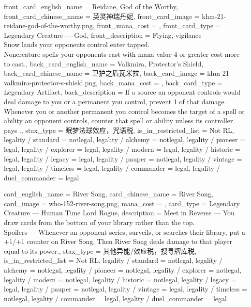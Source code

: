 \documentclass[lang = cn, color = black, 10pt]{AllThatStax}
\begin{document}
\mfcard
{
	front_card_english_name = {Reidane, God of the Worthy},
	front_card_chinese_name = {英灵神瑞丹妮},
	front_card_image = khm-21-reidane-god-of-the-worthy.png,
	front_mana_cost = ,
	front_card_type = Legendary Creature — God,
	front_description = {Flying, vigilance\\
		Snow lands your opponents control enter tapped.\\
		Noncreature spells your opponents cast with mana value 4 or greater cost  more to cast.},
	back_card_english_name = {Valkmira, Protector's Shield},
	back_card_chinese_name = {卫护之盾瓦米拉},
	back_card_image = khm-21-valkmira-protector-s-shield.png,
	back_mana_cost = ,
	back_card_type = Legendary Artifact,
	back_description = {If a source an opponent controls would deal damage to you or a permanent you control, prevent 1 of that damage.\\
		Whenever you or another permanent you control becomes the target of a spell or ability an opponent controls, counter that spell or ability unless its controller pays .},
	stax_type = 眠梦法球效应，咒语税,
	is_in_restricted_list = Not RL,
	legality / standard = notlegal,
	legality / alchemy = notlegal,
	legality / pioneer = legal,
	legality / explorer = legal,
	legality / modern = legal,
	legality / historic = legal,
	legality / legacy = legal,
	legality / pauper = notlegal,
	legality / vintage = legal,
	legality / timeless = legal,
	legality / commander = legal,
	legality / duel_commander = legal
}

\card
{
	card_english_name = {River Song},
	card_chinese_name = {River Song},
	card_image = who-152-river-song.png,
	mana_cost = ,
	card_type = Legendary Creature — Human Time Lord Rogue,
	description = {Meet in Reverse — You draw cards from the bottom of your library rather than the top.\\
		Spoilers — Whenever an opponent scries, surveils, or searches their library, put a +1/+1 counter on River Song. Then River Song deals damage to that player equal to its power.},
	stax_type = 其他异能/效应税，搜寻牌库税,
	is_in_restricted_list = Not RL,
	legality / standard = notlegal,
	legality / alchemy = notlegal,
	legality / pioneer = notlegal,
	legality / explorer = notlegal,
	legality / modern = notlegal,
	legality / historic = notlegal,
	legality / legacy = legal,
	legality / pauper = notlegal,
	legality / vintage = legal,
	legality / timeless = notlegal,
	legality / commander = legal,
	legality / duel_commander = legal
}
\end{document}
